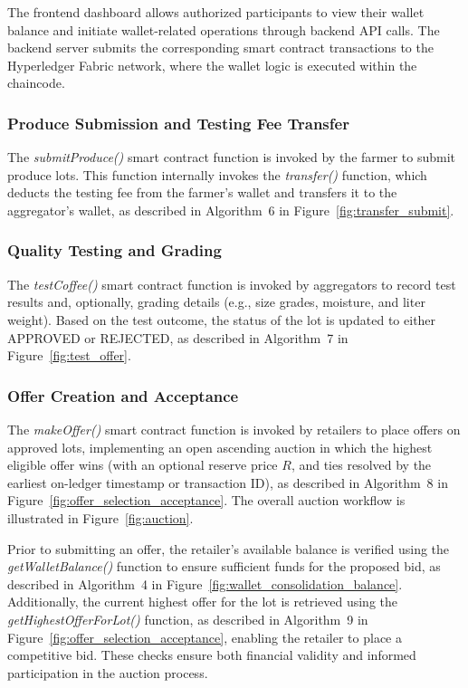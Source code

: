 \documentclass[12pt]{article}
\begin{document}
	The frontend dashboard allows authorized participants to view their wallet balance and initiate wallet-related operations through backend API calls. The backend server submits the corresponding smart contract transactions to the Hyperledger Fabric network, where the wallet logic is executed within the chaincode.

	\subsubsection{Produce Submission and Testing Fee Transfer}
	
	The \textit{submitProduce()} smart contract function is invoked by the farmer to submit produce lots. This function internally invokes the \textit{transfer()} function, which deducts the testing fee from the farmer's wallet and transfers it to the aggregator's wallet, as described in Algorithm~6 in Figure~\ref{fig:transfer_submit}.
	

	\subsubsection{Quality Testing and Grading}
	
	The \textit{testCoffee()} smart contract function is invoked by aggregators to record test results and, optionally, grading details (e.g., size grades, moisture, and liter weight). Based on the test outcome, the status of the lot is updated to either APPROVED or REJECTED, as described in Algorithm~7 in Figure~\ref{fig:test_offer}.

	\subsubsection{Offer Creation and Acceptance}
	
	
	The \textit{makeOffer()} smart contract function is invoked by retailers to place offers on approved lots, implementing an open ascending auction in which the highest eligible offer wins (with an optional reserve price $R$, and ties resolved by the earliest on-ledger timestamp or transaction ID), as described in Algorithm~8 in Figure~\ref{fig:offer_selection_acceptance}. The overall auction workflow is illustrated in Figure~\ref{fig:auction}.
	
	Prior to submitting an offer, the retailer's available balance is verified using the \textit{getWalletBalance()} function to ensure sufficient funds for the proposed bid, as described in Algorithm~4 in Figure~\ref{fig:wallet_consolidation_balance}. Additionally, the current highest offer for the lot is retrieved using the \textit{getHighestOfferForLot()} function, as described in Algorithm~9 in Figure~\ref{fig:offer_selection_acceptance}, enabling the retailer to place a competitive bid. These checks ensure both financial validity and informed participation in the auction process.
	
\end{document}
